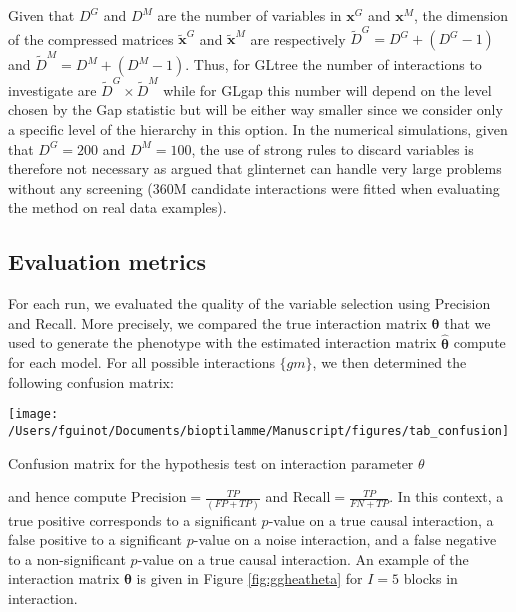 \documentclass[]{book}
\begin{document}
Given that \(D^{\mathit{G}}\) and \(D^{\mathit{M}}\) are the number of variables in
\(\mathbf{x}^{\mathit{G}}\) and \(\mathbf{x}^{\mathit{M}}\), the dimension of the compressed matrices
\(\tilde{\mathbf{x}}^{\mathit{G}}\) and \(\tilde{\mathbf{x}}^{\mathit{M}}\) are respectively
\(\tilde{D}^{\mathit{G}} = D^{\mathit{G}} + (D^{\mathit{G}}-1)\) and
\(\tilde{D}^{\mathit{M}} = D^{\mathit{M}} + (D^{\mathit{M}}-1)\). Thus, for GLtree the number
of interactions to investigate are
\(\tilde{D}^{\mathit{G}} \times \tilde{D}^{\mathit{M}}\) while for GLgap this number
will depend on the level chosen by the Gap statistic but will be either
way smaller since we consider only a specific level of the hierarchy in
this option. In the numerical simulations, given that \(D^{\mathit{G}} = 200\)
and \(D^{\mathit{M}}=100\), the use of strong rules to discard variables is
therefore not necessary as \citep{lim2015learning} argued that glinternet can
handle very large problems without any screening (360M candidate
interactions were fitted when evaluating the method on real data
examples).

\hypertarget{evaluation-metrics}{%
\subsection{Evaluation metrics}\label{evaluation-metrics}}

For each run, we evaluated the quality of the variable selection using
Precision and Recall. More precisely, we compared the true interaction
matrix \(\boldsymbol{\theta}\) that we used to generate the phenotype with the
estimated interaction matrix \(\hat{\boldsymbol{\theta}}\) compute for each model. For
all possible interactions \(\{gm\}\), we then determined the
following confusion matrix:

\begin{center}\texttt{[image: /Users/fguinot/Documents/bioptilamme/Manuscript/figures/tab\_confusion]} \end{center}

\label{tab:tabconfusion}Confusion matrix for the hypothesis test on interaction parameter \(\theta\)

and hence compute \(\text{Precision}={\frac{TP}{(FP+TP)}}\) and
\(\text{Recall}=\frac{TP}{FN+TP}\). In this context, a true positive
corresponds to a significant \(p\)-value on a true causal interaction, a
false positive to a significant \(p\)-value on a noise interaction, and a
false negative to a non-significant \(p\)-value on a true causal
interaction. An example of the interaction matrix \(\boldsymbol{\theta}\) is
given in Figure \ref{fig:ggheatheta} for \(I=5\) blocks in interaction.
\end{document}
